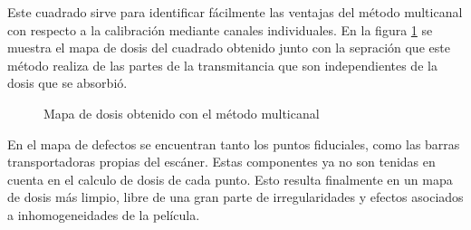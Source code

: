 Este cuadrado sirve para identificar fácilmente las ventajas del método multicanal con respecto a la calibración mediante canales individuales. En la figura \ref{fig:MapaCuadrado} se muestra el mapa de dosis del cuadrado obtenido junto con la sepración que este método realiza de las partes de la transmitancia que son independientes de la dosis que se absorbió.\\
\begin{figure}[H]
	\centering
	\hfill
	\caption{Mapa de dosis obtenido con el método multicanal}
	\label{fig:MapaCuadrado}
\end{figure}

En el mapa de defectos se encuentran tanto los puntos fiduciales, como las barras transportadoras propias del escáner. Estas componentes ya no son tenidas en cuenta en el calculo de dosis de cada punto. Esto resulta finalmente en un mapa de dosis más limpio, libre de una gran parte de irregularidades y efectos asociados a inhomogeneidades de la película.\\

